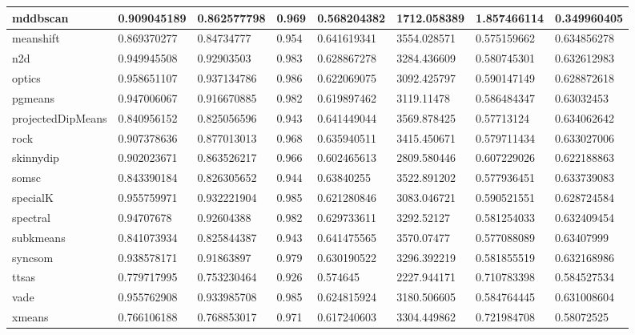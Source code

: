 \begin{table}[H]
\begin{tabular}{|l|l|l|l|l|l|l|l|}
\hline
mddbscan & 0.909045189 & 0.862577798 & 0.969 & 0.568204382 & 1712.058389 & 1.857466114 & 0.349960405 \\
\hline
meanshift & 0.869370277 & 0.84734777 & 0.954 & 0.641619341 & 3554.028571 & 0.575159662 & 0.634856278 \\
\hline
n2d & 0.949945508 & 0.92903503 & 0.983 & 0.628867278 & 3284.436609 & 0.580745301 & 0.632612983 \\
\hline
optics & 0.958651107 & 0.937134786 & 0.986 & 0.622069075 & 3092.425797 & 0.590147149 & 0.628872618 \\
\hline
pgmeans & 0.947006067 & 0.916670885 & 0.982 & 0.619897462 & 3119.11478 & 0.586484347 & 0.63032453 \\
\hline
projectedDipMeans & 0.840956152 & 0.825056596 & 0.943 & 0.641449044 & 3569.878425 & 0.57713124 & 0.634062642 \\
\hline
rock & 0.907378636 & 0.877013013 & 0.968 & 0.635940511 & 3415.450671 & 0.579711434 & 0.633027006 \\
\hline
skinnydip & 0.902023671 & 0.863526217 & 0.966 & 0.602465613 & 2809.580446 & 0.607229026 & 0.622188863 \\
\hline
somsc & 0.843390184 & 0.826305652 & 0.944 & 0.63840255 & 3522.891202 & 0.577936451 & 0.633739083 \\
\hline
specialK & 0.955759971 & 0.932221904 & 0.985 & 0.621280846 & 3083.046721 & 0.590521551 & 0.628724584 \\
\hline
spectral & 0.94707678 & 0.92604388 & 0.982 & 0.629733611 & 3292.52127 & 0.581254033 & 0.632409454 \\
\hline
subkmeans & 0.841073934 & 0.825844387 & 0.943 & 0.641475565 & 3570.07477 & 0.577088089 & 0.63407999 \\
\hline
syncsom & 0.938578171 & 0.91863897 & 0.979 & 0.630190522 & 3296.392219 & 0.581855519 & 0.632168986 \\
\hline
ttsas & 0.779717995 & 0.753230464 & 0.926 & 0.574645 & 2227.944171 & 0.710783398 & 0.584527534 \\
\hline
vade & 0.955762908 & 0.933985708 & 0.985 & 0.624815924 & 3180.506605 & 0.584764445 & 0.631008604 \\
\hline
xmeans & 0.766106188 & 0.768853017 & 0.971 & 0.617240603 & 3304.449862 & 0.721984708 & 0.58072525 \\
\hline
\end{tabular}
\end{table}